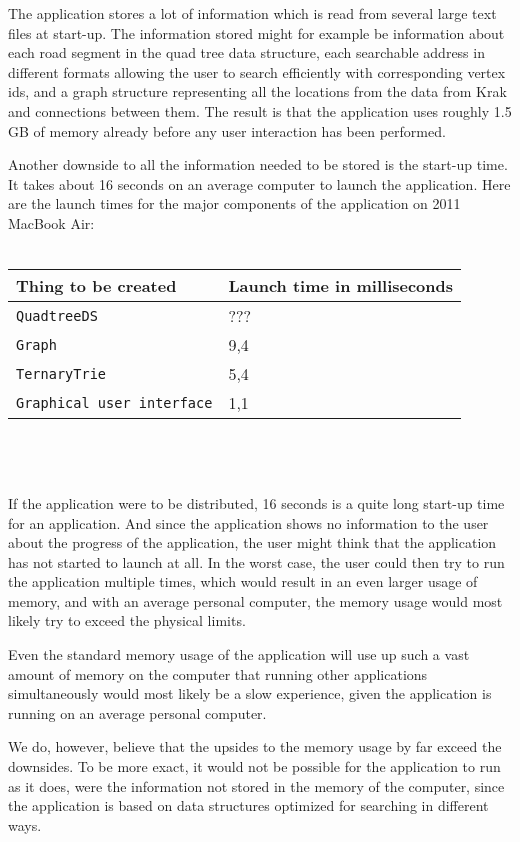 The application stores a lot of information which is read from several large text files at start-up. The information stored might for example be information about each road segment in the quad tree data structure, each searchable address in different formats allowing the user to search efficiently with corresponding vertex ids, and a graph structure representing all the locations from the data from Krak and connections between them. The result is that the application uses roughly 1.5 GB of memory already before any user interaction has been performed.

Another downside to all the information needed to be stored is the start-up time. It takes about 16 seconds on an average computer to launch the application. Here are the launch times for the major components of the application on 2011 MacBook Air: \\ \\
\begin{tabular}{ p{5cm} | p{3cm} }
	\textbf{Thing to be created} & \textbf{Launch time in milliseconds} \\
	\hline
	\texttt{QuadtreeDS} & ??? \\
	\texttt{Graph} & 9,4 \\
	\texttt{TernaryTrie} & 5,4 \\
	\texttt{Graphical user interface} & 1,1
\end{tabular}
\\ \\ \\
If the application were to be distributed, 16 seconds is a quite long start-up time for an application. And since the application shows no information to the user about the progress of the application, the user might think that the application has not started to launch at all. In the worst case, the user could then try to run the application multiple times, which would result in an even larger usage of memory, and with an average personal computer, the memory usage would most likely try to exceed the physical limits.

Even the standard memory usage of the application will use up such a vast amount of memory on the computer that running other applications simultaneously would most likely be a slow experience, given the application is running on an average personal computer.

We do, however, believe that the upsides to the memory usage by far exceed the downsides. To be more exact, it would not be possible for the application to run as it does, were the information not stored in the memory of the computer, since the application is based on data structures optimized for searching in different ways.

